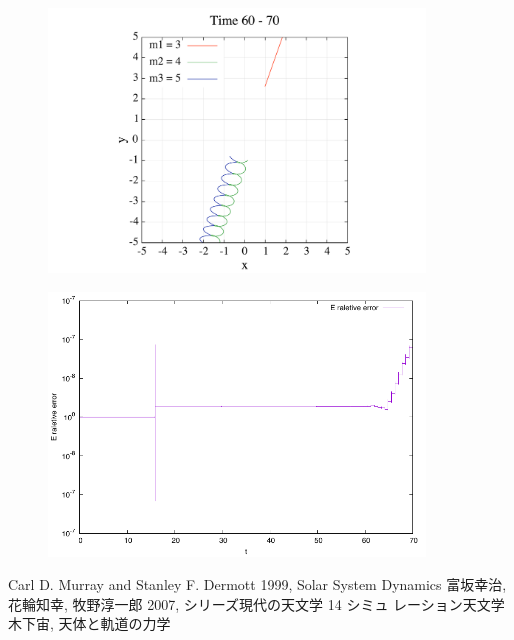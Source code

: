 \documentclass[11pt,a4paper,oneside,onecolumn]{jarticle}
\begin{document}
\begin{figure}[H]
\centering
\includegraphics[width=10cm]{./image/pythagoras_orbit_60to70.pdf}
\caption{\label{}}
\end{figure}

\begin{figure}[H]
\centering
\includegraphics[width=10cm]{./image/pythagoras_E_error.pdf}
\caption{\label{}}
\end{figure}


\begin{thebibliography}{9}
   Carl D. Murray and Stanley F. Dermott 1999, Solar System Dynamics
   富坂幸治, 花輪知幸, 牧野淳一郎 2007, シリーズ現代の天文学 14 シミュ レーション天文学
   木下宙, 天体と軌道の力学
\end{thebibliography}
\end{document}
